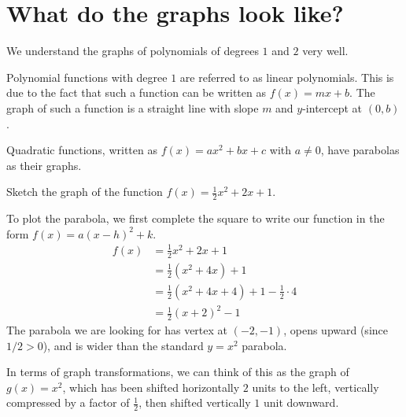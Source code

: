 \documentclass{ximera}
\begin{document}
\section{What do the graphs look like?}
We understand the graphs of polynomials of degrees $1$ and $2$ very well.

Polynomial functions with degree $1$ are referred to as linear polynomials.  This is due to the fact
that such a function can be written as $f(x) = mx + b$.  The graph of such a function is a straight line
with slope $m$ and $y$-intercept at $(0,b)$.

Quadratic functions, written as $f(x) = ax^2 + bx + c$ with $a \ne 0$, have parabolas as their graphs.
\begin{example}
	Sketch the graph of the function $f(x) = \frac{1}{2} x^2 + 2x + 1$.
	\begin{explanation}
		To plot the parabola, we first complete the square to write our function in the form $f(x) = a(x-h)^2 +k$.
		\begin{align*}
			f(x) &= \frac{1}{2} x^2 + 2x + 1 \\
				&= \frac{1}{2} \left( x^2+ 4x \right) + 1\\
				&= \frac{1}{2}\left( x^2 + 4x + 4\right) + 1 - \frac{1}{2} \cdot 4\\
				&= \frac{1}{2} \left( x+2 \right)^2 -1
		\end{align*} 
		The parabola we are looking for has vertex at $(-2, -1)$, opens upward (since $1/2 > 0$), and is wider than the standard
		$y=x^2$ parabola.
		
		In terms of graph transformations, we can think of this as the graph of $g(x) = x^2$, which has been shifted horizontally $2$ units to the left,
		vertically compressed by a factor of $\frac{1}{2}$, then shifted vertically $1$ unit downward.
	\end{explanation}
\end{example}
\end{document}
